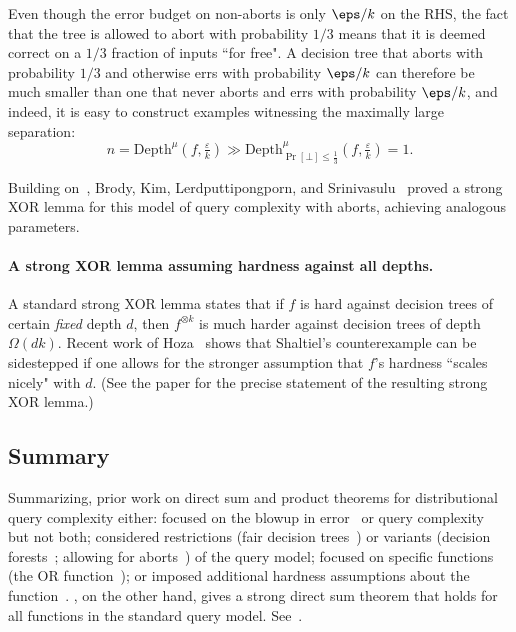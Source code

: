 Even though the error budget on non-aborts is only $\eps/k$ on the RHS, the fact that the tree is allowed to abort with probability $1/3$ means that it is deemed correct on a $1/3$ fraction of inputs ``for free". A decision tree that aborts with probability $1/3$ and otherwise errs with probability $\eps/k$ can therefore be much smaller than one that never aborts and errs with probability $\eps/k$, and indeed, it is easy to construct examples witnessing the maximally large separation: 
\[ 
n = \mathrm{Depth}^{\mu}(f,\tfrac{\varepsilon}{k})  \gg \mathrm{Depth}^{\mu}_{\Pr[\bot]\le\frac1{3}}(f,\tfrac{\varepsilon}{k}) = 1.
\] 



Building on~\cite{BB19}, Brody, Kim, Lerdputtipongporn, and Srinivasulu~\cite{BKLS23} proved a strong XOR lemma for this model of query complexity with aborts, achieving analogous parameters.  

\paragraph{A strong XOR lemma assuming hardness against all depths.}
A standard strong XOR lemma states that if $f$ is hard against decision trees of certain {\sl fixed} depth $d$, then $f^{\otimes k}$ is much harder against decision trees of depth $\Omega(dk)$. Recent work of Hoza~\cite{Hoza23} shows that Shaltiel's counterexample can be sidestepped if one allows for the stronger assumption that $f$'s hardness ``scales nicely" with $d$. (See the paper for the precise statement of the resulting strong XOR lemma.) 


\subsection{Summary}

Summarizing, prior work on direct sum and product theorems for distributional query complexity either: focused on the blowup in error~\cite{IRW94} or query complexity~\cite{JKS10, BDK18}  but not both; considered restrictions (fair decision trees~\cite{Sha04}) or variants (decision forests~\cite{NRS94}; allowing for aborts~\cite{BB19, BKLS23}) of the query model; focused on specific functions (the OR function~\cite{KSdW07}); or imposed additional hardness assumptions about the function~\cite{Hoza23}. , on the other hand, gives a strong direct sum theorem that holds for all functions in the standard query model. See~. %
\medskip 


